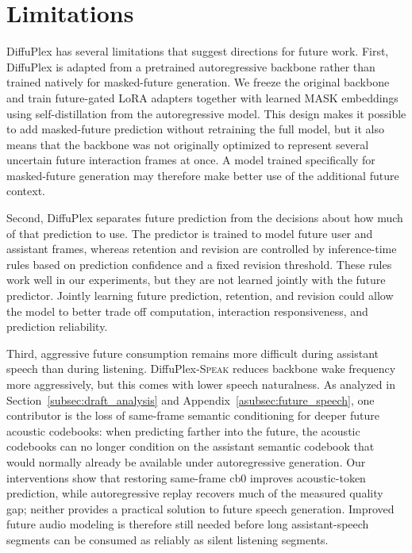 \appendix
\newpage

\section{Limitations}
\label{asec:limitations}

DiffuPlex has several limitations that suggest directions for future work.
First, DiffuPlex is adapted from a pretrained autoregressive backbone rather than trained natively for masked-future generation.
We freeze the original backbone and train future-gated LoRA adapters together with learned MASK embeddings using self-distillation from the autoregressive model.
This design makes it possible to add masked-future prediction without retraining the full model, but it also means that the backbone was not originally optimized to represent several uncertain future interaction frames at once.
A model trained specifically for masked-future generation may therefore make better use of the additional future context.

Second, DiffuPlex separates future prediction from the decisions about how much of that prediction to use.
The predictor is trained to model future user and assistant frames, whereas retention and revision are controlled by inference-time rules based on prediction confidence and a fixed revision threshold.
These rules work well in our experiments, but they are not learned jointly with the future predictor.
Jointly learning future prediction, retention, and revision could allow the model to better trade off computation, interaction responsiveness, and prediction reliability.

Third, aggressive future consumption remains more difficult during assistant speech than during listening.
DiffuPlex-\textsc{Speak} reduces backbone wake frequency more aggressively, but this comes with lower speech naturalness.
As analyzed in Section~\ref{subsec:draft_analysis} and Appendix~\ref{asubsec:future_speech}, one contributor is the loss of same-frame semantic conditioning for deeper future acoustic codebooks: when predicting farther into the future, the acoustic codebooks can no longer condition on the assistant semantic codebook that would normally already be available under autoregressive generation.
Our interventions show that restoring same-frame cb0 improves acoustic-token prediction, while autoregressive replay recovers much of the measured quality gap; neither provides a practical solution to future speech generation.
Improved future audio modeling is therefore still needed before long assistant-speech segments can be consumed as reliably as silent listening segments.

